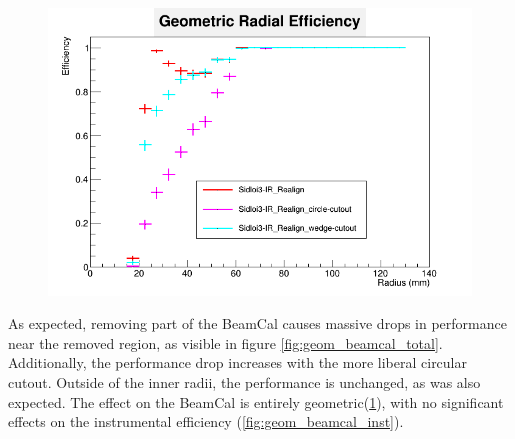 \documentclass{report}
\begin{document}
                \begin{figure}[H]
                    \includegraphics[width=\textwidth]{RadialEfficiency_geometric_geom}
                    \centering
                    \caption{}
                    \label{fig:geom_beamcal_geom}
                \end{figure}

                As expected, removing part of the BeamCal causes massive drops in performance near the removed region, as visible in figure \ref{fig:geom_beamcal_total}. Additionally, the performance drop increases with the more liberal circular cutout. Outside of the inner radii, the performance is unchanged, as was also expected. The effect on the BeamCal is entirely geometric(\ref{fig:geom_beamcal_geom}), with no significant effects on the instrumental efficiency (\ref{fig:geom_beamcal_inst}).
                
\end{document}
